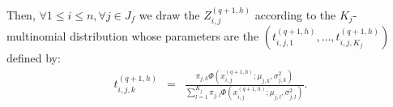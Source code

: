\documentclass[12pt,a4paper]{report}
\begin{document}
			

	Then, $\forall 1\leq i \leq n, \forall j \in J_f$ we draw the $Z_{i,j}^{(q+1,h)}$ according to the $K_j$-multinomial distribution whose parameters are the $(t_{i,j,1}^{(q+1,h)},\dots ,t_{i,j,K_j}^{(q+1,h)})$ defined by:
	\begin{eqnarray}
		t_{i,j,k}^{(q+1,h)}&=&\frac{\pi_{j,k}\Phi(x_{i,j}^{(q+1,h)};\mu_{j,k},\sigma_{j,k}^2)}{\sum_{l=1}^{K_j}\pi_{j,l}\Phi(x_{i,j}^{(q+1,h)};\mu_{j,l},\sigma_{j,l}^2) }. \nonumber 
	\end{eqnarray}
		
\end{document}
